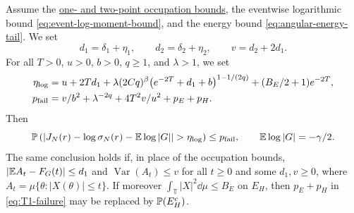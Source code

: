 \begin{theorem}\label{thm:T1}
Assume the \hyperref[hyp:occupation]{one- and two-point occupation bounds},
the eventwise logarithmic bound \eqref{eq:event-log-moment-bound},
and the energy bound \eqref{eq:angular-energy-tail}. We set
\[
 d_1=\delta_1+\eta_1,\qquad d_2=\delta_2+\eta_2,
 \qquad v=d_2+2d_1.
\]
For all $T>0$, $u>0$, $b>0$, $q\geq1$, and $\lambda>1$, we set
\begin{align}
 \eta_{\log}={}&u+2Td_1+\lambda(2Cq)^\beta
        \bigl(e^{-2T}+d_1+b\bigr)^{1-1/(2q)}
        +(B_E/2+1)e^{-2T}, \label{eq:T1-error}\\
 p_{\rm fail}={}&v/b^2+\lambda^{-2q}+4T^2v/u^2+p_E+p_H. \label{eq:T1-failure}
\end{align}
Then
\[
 \Prob\left(\left|J_N(r)-\log\sigma_N(r)
                   -\E\log|G|\right|>\eta_{\log}\right)\leq p_{\rm fail},
 \qquad \E\log|G|=-\gamma/2.
\]
The same conclusion holds if, in place of the occupation bounds,
$|\mathbb E A_t-F_G(t)|\leq d_1$ and $\operatorname{Var}(A_t)\leq v$ for all
$t\geq0$ and some $d_1,v\geq0$, where
$A_t=\mu\{\theta:|X(\theta)|\leq t\}$. If moreover
$\int_{\mathbb T}|X|^2\dd\mu\leq B_E$ on $E_H$, then $p_E+p_H$ in
\eqref{eq:T1-failure} may be replaced by $\mathbb P(E_H^c)$.
\end{theorem}

